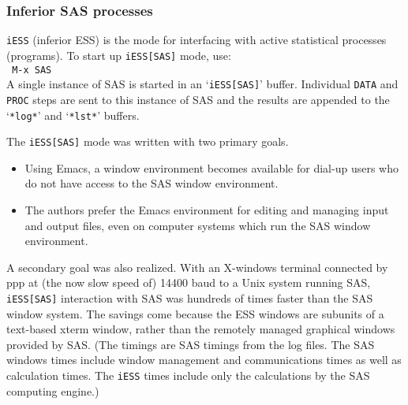 \documentclass{article}
\newcommand{\stexttt}[1]{{\small\texttt{#1}}}
\newcommand{\elcode}[1]{\\{\stexttt{\hspace*{2em} #1}}\\}
\newcommand{\file}[1]{`\stexttt{#1}'}
\begin{document}
% 
% 

\subsubsection{Inferior SAS processes}
\label{sec:SAS:proc:inf}

\stexttt{iESS} (inferior ESS) is the mode for interfacing with active
statistical processes (programs).  To start up \stexttt{iESS[SAS]} mode, use:
\elcode{M-x SAS}
A single instance of SAS is started in an \file{iESS[SAS]} buffer.  Individual
\stexttt{DATA} and \stexttt{PROC} steps are sent to this instance of SAS and the results
are appended to the \file{*log*} and \file{*lst*} buffers.

The \stexttt{iESS[SAS]} mode was written with two primary goals.
\begin{itemize}
\item Using Emacs, a window environment becomes available for dial-up
  users who do not have access to the SAS window environment.
\item The authors prefer the Emacs environment for editing and
  managing input and output files, even on computer systems which run
  the SAS window environment.
\end{itemize}
A secondary goal was also realized.  With an X-windows
terminal connected by ppp at (the now slow speed of)
14400 baud to a Unix system running SAS,
\stexttt{iESS[SAS]} interaction with SAS was hundreds of times faster than the
SAS window system.  The savings come because the ESS windows are
subunits of a text-based xterm window, rather than the remotely
managed graphical windows provided by SAS.  (The timings are SAS
timings from the log files.  The SAS windows times include window
management and communications times as well as calculation times.  The
\stexttt{iESS} times include only the calculations by the SAS computing engine.)
\end{document}

